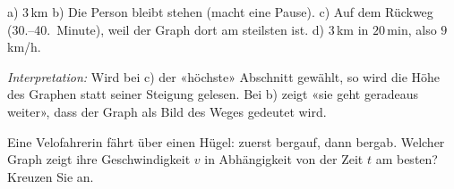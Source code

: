 \documentclass[11pt]{exam}
\newcommand{\aufgabe}[1]{%
  \needspace{8\baselineskip}%
  \renewcommand{\questionlabel}{\textbf{#1}}%
  \question}
\newcommand{\raum}[1]{\ifprintanswers\else\fillwithgrid{#1}\fi}
\newcommand{\diagnose}[1]{\par\smallskip\textit{Interpretation:} #1}
\begin{document}
\begin{questions}
\begin{solution}
  a) $3$\,km \quad b) Die Person bleibt stehen (macht eine Pause). \quad
  c) Auf dem Rückweg (30.--40.\ Minute), weil der Graph dort am steilsten ist.
  \quad d) $3$\,km in $20$\,min, also $9$\,km/h.
  \diagnose{Wird bei c) der «höchste» Abschnitt gewählt, so wird die Höhe des
  Graphen statt seiner Steigung gelesen. Bei b) zeigt «sie geht geradeaus
  weiter», dass der Graph als Bild des Weges gedeutet wird.}
\end{solution}
\raum{3.5cm}

\aufgabe{7.4}
Eine Velofahrerin fährt über einen Hügel: zuerst bergauf, dann bergab.
Welcher Graph zeigt ihre Geschwindigkeit $v$ in Abhängigkeit von der Zeit $t$
am besten? Kreuzen Sie an.


\end{questions}
\end{document}
